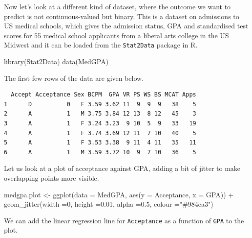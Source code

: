 \documentclass[
  a4paper,
  DIV=11,
  numbers=noendperiod]{scrreprt}
\newenvironment{Shaded}{\begin{snugshade}}{\end{snugshade}}
\newcommand{\AttributeTok}[1]{\textcolor[rgb]{0.40,0.45,0.13}{#1}}
\newcommand{\DecValTok}[1]{\textcolor[rgb]{0.68,0.00,0.00}{#1}}
\newcommand{\FloatTok}[1]{\textcolor[rgb]{0.68,0.00,0.00}{#1}}
\newcommand{\FunctionTok}[1]{\textcolor[rgb]{0.28,0.35,0.67}{#1}}
\newcommand{\NormalTok}[1]{\textcolor[rgb]{0.00,0.23,0.31}{#1}}
\newcommand{\OtherTok}[1]{\textcolor[rgb]{0.00,0.23,0.31}{#1}}
\newcommand{\SpecialCharTok}[1]{\textcolor[rgb]{0.37,0.37,0.37}{#1}}
\newcommand{\StringTok}[1]{\textcolor[rgb]{0.13,0.47,0.30}{#1}}
\newenvironment{fbxSimple}[3]{\begin{tcolorbox}[enhanced, breakable,%
attach boxed title to top*={xshift=1.4pt},
boxed title style={boxrule=0.0mm, fuzzy shadow={1pt}{-1pt}{0mm}{0.1mm}{gray}, arc=.3em, rounded corners=east, sharp corners=west}, colframe=#1-color2, colbacktitle=#1-color1, colback = white, coltitle=black,  titlerule=0mm, toprule=0pt, bottomrule=.7pt, leftrule=.3em, rightrule=.7pt, outer arc=.3em,  	left=.5em, right=.5em, bottomtitle=1mm, toptitle=1mm,title=\textbf{#2}\hspace{0.5em}{#3}]}
{\end{tcolorbox}}
\begin{document}
\label{gpa-and-admission-to-medical-school}
\begin{fbxSimple}{Example}{Example 2: }{GPA and admission to medical school}
\label{gpa-and-admission-to-medical-school}
Now let's look at a different kind of dataset, where the outcome we want
to predict is not continuous-valued but binary. This is a dataset on
admissions to US medical schools, which gives the admission status, GPA
and standardised test scores for 55 medical school applicants from a
liberal arts college in the US Midwest and it can be loaded from the
\texttt{Stat2Data} package in R.

\begin{Shaded}
\begin{Highlighting}[]
\FunctionTok{library}\NormalTok{(Stat2Data)}
\FunctionTok{data}\NormalTok{(MedGPA)}
\end{Highlighting}
\end{Shaded}

The first few rows of the data are given below.

\begin{verbatim}
  Accept Acceptance Sex BCPM  GPA VR PS WS BS MCAT Apps
1      D          0   F 3.59 3.62 11  9  9  9   38    5
2      A          1   M 3.75 3.84 12 13  8 12   45    3
3      A          1   F 3.24 3.23  9 10  5  9   33   19
4      A          1   F 3.74 3.69 12 11  7 10   40    5
5      A          1   F 3.53 3.38  9 11  4 11   35   11
6      A          1   M 3.59 3.72 10  9  7 10   36    5
\end{verbatim}

Let us look at a plot of acceptance against GPA, adding a bit of jitter
to make overlapping points more visible.

\begin{Shaded}
\begin{Highlighting}[]
\NormalTok{medgpa.plot }\OtherTok{\textless{}{-}} \FunctionTok{ggplot}\NormalTok{(}\AttributeTok{data =}\NormalTok{ MedGPA, }\FunctionTok{aes}\NormalTok{(}\AttributeTok{y =}\NormalTok{ Acceptance, }\AttributeTok{x =}\NormalTok{ GPA)) }\SpecialCharTok{+}
               \FunctionTok{geom\_jitter}\NormalTok{(}\AttributeTok{width =}\DecValTok{0}\NormalTok{, }\AttributeTok{height =}\FloatTok{0.01}\NormalTok{, }\AttributeTok{alpha =}\FloatTok{0.5}\NormalTok{, }\AttributeTok{colour =}\StringTok{"\#984ea3"}\NormalTok{)}
\end{Highlighting}
\end{Shaded}

We can add the linear regression line for \texttt{Acceptance} as a
function of \texttt{GPA} to the plot.


\end{fbxSimple}
\end{document}
